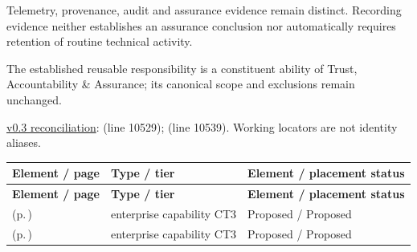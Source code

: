
Telemetry, provenance, audit and assurance evidence remain distinct. Recording evidence neither establishes an assurance conclusion nor automatically requires retention of routine technical activity.



The established reusable responsibility is a constituent ability of Trust, Accountability \& Assurance; its canonical scope and exclusions remain unchanged.


\hyperref[model:reconciliation]{v0.3 reconciliation}: \texttt{} (line 10529); \texttt{} (line 10539). Working locators are not identity aliases.
\begingroup\small\setlength{\TableWidth}{\dimexpr\linewidth-6\tabcolsep-4\arrayrulewidth\relax}
\begin{longtable}{|>{\raggedright\arraybackslash}p{0.52\TableWidth}|>{\raggedright\arraybackslash}p{0.2\TableWidth}|>{\raggedright\arraybackslash}p{0.28\TableWidth}|}
\hline\rowcolor{TableHead}\textbf{Element / page} & \textbf{Type / tier} & \textbf{Element / placement status}\\\hline\endfirsthead
\hline\rowcolor{TableHead}\textbf{Element / page} & \textbf{Type / tier} & \textbf{Element / placement status}\\\hline\endhead
\hline\endfoot
\nameref{cap:ec-information-attribution-lineage} (p.\,\pageref{cap:ec-information-attribution-lineage}) & enterprise capability CT3 & Proposed / Proposed\\\hline
\nameref{cap:ec-governed-activity-audit-evidence} (p.\,\pageref{cap:ec-governed-activity-audit-evidence}) & enterprise capability CT3 & Proposed / Proposed\\\hline
\end{longtable}\endgroup

